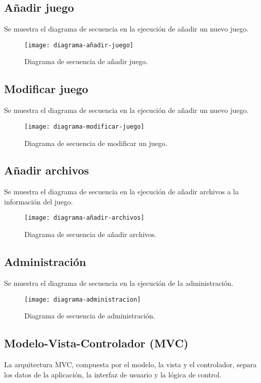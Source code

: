 \newpage
\subsection{Añadir juego}
Se muestra el diagrama de secuencia en la ejecución de añadir un nuevo juego.

\begin{figure}[h!]
\centering
\texttt{[image: diagrama-añadir-juego]}
\caption{Diagrama de secuencia de añadir juego.}
\label{fig:diagrama-secuencia-añadir-juego}
\end{figure}

\newpage
\subsection{Modificar juego}
Se muestra el diagrama de secuencia en la ejecución de añadir un nuevo juego.

\begin{figure}[h!]
\centering
\texttt{[image: diagrama-modificar-juego]}
\caption{Diagrama de secuencia de modificar un juego.}
\label{fig:diagrama-secuencia-modificar-juego}
\end{figure}

\newpage
\subsection{Añadir archivos}
Se muestra el diagrama de secuencia en la ejecución de añadir archivos a la información del juego.

\begin{figure}[h!]
\centering
\texttt{[image: diagrama-añadir-archivos]}
\caption{Diagrama de secuencia de añadir archivos.}
\label{fig:diagrama-secuencia-añadir-archivos}
\end{figure}

\newpage
\subsection{Administración}
Se muestra el diagrama de secuencia en la ejecución de la administración.
\begin{figure}[h!]
\centering
\texttt{[image: diagrama-administracion]}
\caption{Diagrama de secuencia de administración.}
\label{fig:diagrama-secuencia-administración}
\end{figure}

\newpage
\subsection{Modelo-Vista-Controlador (MVC)}
La arquitectura MVC, compuesta por el modelo, la vista y el controlador, separa los datos de la aplicación, la interfaz de usuario y la lógica de control.

